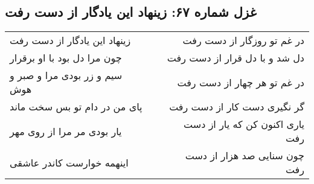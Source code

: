 \begin{center}
\section*{غزل شماره ۶۷: زینهاد این یادگار از دست رفت}
\label{sec:067}
\begin{longtable}{l p{0.5cm} r}
زینهاد این یادگار از دست رفت
&&
در غم تو روزگار از دست رفت
\\
چون مرا دل بود با او برقرار
&&
دل شد و با دل قرار از دست رفت
\\
سیم و زر بودی مرا و صبر و هوش
&&
در غم تو هر چهار از دست رفت
\\
پای من در دام تو بس سخت ماند
&&
گر نگیری دست کار از دست رفت
\\
یار بودی مر مرا از روی مهر
&&
یاری اکنون کن که یار از دست رفت
\\
اینهمه خوارست کاندر عاشقی
&&
چون سنایی صد هزار از دست رفت
\\
\end{longtable}
\end{center}
